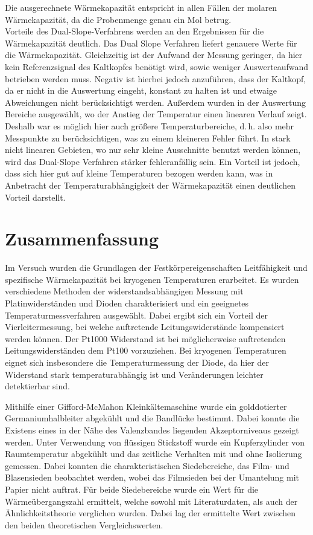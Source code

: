 \documentclass[parskip=half, a4paper,twoside,final]{article}
\begin{document}
Die ausgerechnete Wärmekapazität entspricht in allen Fällen der molaren Wärmekapazität, da die Probenmenge genau ein Mol betrug. \\
Vorteile des Dual-Slope-Verfahrens werden an den Ergebnissen für die Wärmekapazität deutlich. Das Dual Slope Verfahren liefert genauere Werte für die Wärmekapazität. Gleichzeitig ist der Aufwand der Messung geringer, da hier kein Referenzsignal des Kaltkopfes benötigt wird, sowie weniger Auswerteaufwand betrieben werden muss. Negativ ist hierbei jedoch anzuführen, dass der Kaltkopf, da er nicht in die Auswertung eingeht, konstant zu halten ist und etwaige Abweichungen nicht berücksichtigt werden. Außerdem wurden in der Auswertung Bereiche ausgewählt, wo der Anstieg der Temperatur einen linearen Verlauf zeigt. Deshalb war es möglich hier auch größere Temperaturbereiche, d.\,h. also mehr Messpunkte zu berücksichtigen, was zu einem kleineren Fehler führt. In stark nicht linearen Gebieten, wo nur sehr kleine Ausschnitte benutzt werden können, wird das Dual-Slope Verfahren stärker fehleranfällig sein. Ein Vorteil ist jedoch, dass sich hier gut auf kleine Temperaturen bezogen werden kann, was in Anbetracht der Temperaturabhängigkeit der Wärmekapazität einen deutlichen Vorteil darstellt.
\section{Zusammenfassung}
Im Versuch wurden die Grundlagen der Festkörpereigenschaften Leitfähigkeit und spezifische Wärmekapazität bei kryogenen Temperaturen erarbeitet. Es wurden verschiedene Methoden der widerstandsabhängigen Messung mit Platinwiderständen und Dioden charakterisiert und ein geeignetes Temperaturmessverfahren ausgewählt. Dabei ergibt sich ein Vorteil der Vierleitermessung, bei welche auftretende Leitungswiderstände kompensiert werden können. Der Pt1000 Widerstand ist bei möglicherweise auftretenden Leitungswiderständen dem Pt100 vorzuziehen. Bei kryogenen Temperaturen eignet sich insbesondere die Temperaturmessung der Diode, da hier der Widerstand stark temperaturabhängig ist und Veränderungen leichter detektierbar sind.

Mithilfe einer Gifford-McMahon Kleinkältemaschine wurde ein golddotierter Germaniumhalbleiter abgekühlt und die Bandlücke bestimmt. Dabei konnte die Existens eines in der Nähe des Valenzbandes liegenden Akzeptorniveaus gezeigt werden. Unter Verwendung von flüssigen Stickstoff wurde ein Kupferzylinder von Raumtemperatur abgekühlt und das zeitliche Verhalten mit und ohne Isolierung gemessen. Dabei konnten die charakteristischen Siedebereiche, das Film- und Blasensieden beobachtet werden, wobei das Filmsieden bei der Umantelung mit Papier nicht auftrat. Für beide Siedebereiche wurde ein Wert für die Wärmeübergangszahl ermittelt, welche sowohl mit Literaturdaten, als auch der Ähnlichkeitstheorie verglichen wurden. Dabei lag der ermittelte Wert zwischen den beiden theoretischen Vergleichswerten.
\end{document}
